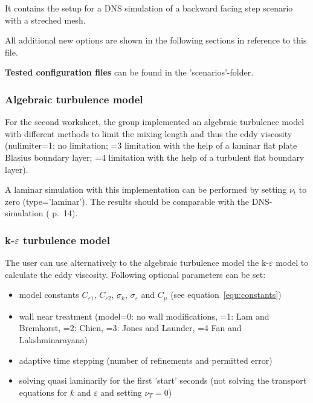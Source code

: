\noii It contains the setup for a DNS simulation of a backward facing step scenario with a streched mesh.


\noii All additional new options are shown in the following sections in reference to this file.

\noii \textbf{Tested configuration files} can be found in the 'scenarios'-folder.

\newpage
\subsubsection*{Algebraic turbulence model}

For the second worksheet, the group implemented an algebraic turbulence model with different methods to limit the mixing length and thus the eddy viscosity (nulimiter=1: no limitation; =3 limitation with the help of a laminar flat plate Blasius boundary layer; =4 limitation with the help of a turbulent flat boundary layer). 


\noii A laminar simulation with this implementation can be performed by setting $\nu_t$ to zero (type='laminar'). The results should be comparable with the DNS-simulation (\citep{lienen2015} p.~14).  

\subsubsection*{k-$\varepsilon$ turbulence model}

The user can use alternatively to the algebraic turbulence model the k-$\varepsilon$ model to calculate the eddy viscosity. Following optional parameters can be set:
\begin{itemize}
\item model constants $C_{\varepsilon 1}$, $C_{\varepsilon 2}$, $\sigma_k$, $\sigma_\varepsilon$ and $C_{\mu}$ (see equation~\ref{equ:constants})
\item wall near treatment (model=0: no wall modifications, =1: Lam and Bremhorst, =2: Chien, =3: Jones and Launder, =4 Fan and Lakshminarayana)
\item adaptive time stepping (number of refinements and permitted error)
\item solving quasi laminarily for the first 'start' seconds (not solving the transport equations for $k$ and $\varepsilon$ and setting $\nu_T=0$)
\end{itemize}


